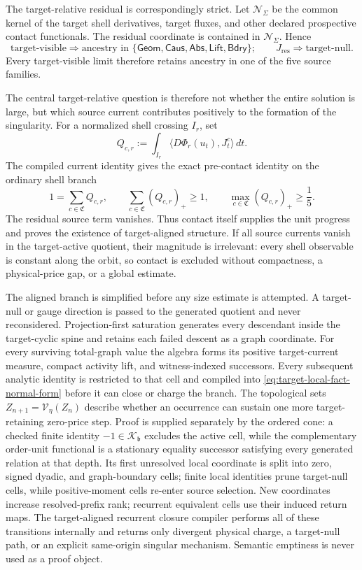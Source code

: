 \documentclass[11pt]{article}
\numberwithin{section}{part}
\theoremstyle{plain}
\theoremstyle{definition}
\theoremstyle{remark}
\newcommand{\Geom}{\mathsf{Geom}}
\newcommand{\Caus}{\mathsf{Caus}}
\newcommand{\Abs}{\mathsf{Abs}}
\newcommand{\Lift}{\mathsf{Lift}}
\newcommand{\Bdry}{\mathsf{Bdry}}
\newcommand{\Res}{J_{\mathrm{res}}}
\newcommand{\Channels}{\mathfrak C}
\newcommand{\Null}{\mathscr N}
\begin{document}
The target-relative residual is correspondingly strict.  Let
\(\Null_\Sigma\) be the common kernel of the target shell derivatives, target
fluxes, and other declared prospective contact functionals.  The residual
coordinate is contained in \(\Null_\Sigma\).  Hence
\[
 \boxed{
 \text{target-visible}\Longrightarrow
 \text{ancestry in }\{\Geom,\Caus,\Abs,\Lift,\Bdry\};
 \qquad
 \Res\Longrightarrow\text{target-null}.}
\]
Every target-visible limit therefore retains ancestry in one of the five
source families.

The central target-relative question is therefore not whether the entire
solution is large, but which source current contributes positively to the
formation of the singularity.  For a normalized shell crossing \(I_r\), set
\[
 Q_{c,r}:=\int_{I_r}\langle D\Phi_r(u_t),J_t^c\rangle\,dt.
\]
The compiled current identity gives the exact pre-contact identity on the
ordinary shell branch
\[
 1=\sum_{c\in\Channels}Q_{c,r},
 \qquad
 \sum_{c\in\Channels}(Q_{c,r})_+\ge1,
 \qquad
 \max_{c\in\Channels}(Q_{c,r})_+\ge\frac15.
\]
The residual source term vanishes.  Thus contact itself supplies the unit
progress and proves the existence of target-aligned structure.  If all source
currents vanish in the target-active quotient, their magnitude is irrelevant:
every shell observable is constant along the orbit, so contact is excluded
without compactness, a physical-price gap, or a global estimate.

The aligned branch is simplified before any size estimate is attempted.  A
target-null or gauge direction is passed to the generated quotient and never
reconsidered.  Projection-first saturation generates every descendant inside
the target-cyclic spine and retains each failed descent as a graph coordinate.
For every surviving total-graph value the algebra forms its
positive target-current measure, compact activity lift, and witness-indexed
successors.  Every subsequent analytic identity is restricted to that cell
and compiled into \eqref{eq:target-local-fact-normal-form} before it can close
or charge the branch.  The topological sets
\(Z_{n+1}=\mathcal V_\eta(Z_n)\) describe whether an occurrence can sustain
one more target-retaining zero-price step.  Proof is supplied separately by
the ordered cone: a checked finite identity
\(-1\in\mathcal K_{\mathfrak b}\) excludes the active cell, while the complementary
order-unit functional is a stationary equality successor satisfying every
generated relation at that depth.  Its first unresolved local coordinate is
split into zero, signed dyadic, and graph-boundary cells; finite local
identities prune target-null cells, while positive-moment cells re-enter
source selection.  New coordinates increase resolved-prefix rank; recurrent
equivalent cells use their induced return maps.  The target-aligned recurrent
closure compiler performs all of these transitions internally and returns
only divergent physical charge, a target-null path, or an explicit
same-origin singular mechanism.  Semantic emptiness is never used as a proof
object.
\end{document}
